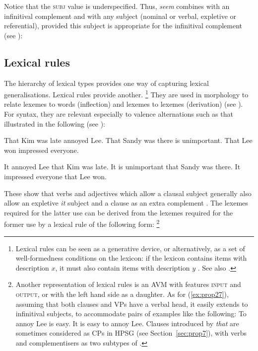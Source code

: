 \documentclass[output=paper,biblatex,babelshorthands,newtxmath,draftmode,colorlinks,citecolor=brown]{langscibook}
\begin{document}
\noindent
Notice that the \textsc{subj} value is underspecified. Thus, \emph{seem} combines with an
infinitival complement and with any subject (nominal or verbal, expletive or referential), provided
this subject is appropriate for the infinitival complement (see
): 

\eal\label{ex:prop25}
\zl


\subsection{Lexical rules}\label{sec:prop4.2}
\label{prop:sec-lex-rules}

The hierarchy of lexical types provides one way of capturing lexical generalisations. Lexical rules provide another.%
%
\footnote{Lexical rules can be seen as a generative device, or alternatively, as a set of
  well-formedness conditions on the lexicon: if the lexicon contains items with description $x$, it
  must also contain items with description $y$ \citep{Meurers2001a}. See also .}
%
They are used in morphology to relate lexemes to words (inflection) and lexemes to lexemes
(derivation) (see ). For syntax, they are relevant especially to valence alternations such as that illustrated in the following (see ):

\eal\label{ex:prop26}
\ex That Kim was late annoyed Lee.
\ex That Sandy was there is unimportant. 
\ex That Lee won impressed everyone.
\zl
	
\eal\label{ex:prop27}
\ex It annoyed Lee that Kim was late.
\ex It is unimportant that Sandy was there. 
\ex It impressed everyone that Lee won.
\zl

\noindent
These show that verbs and adjectives which allow a clausal subject generally also allow an expletive \emph{it} subject and a clause as an extra complement \citep[150]{ps2}. The lexemes required for the latter use can be derived from the lexemes required for the former use by a lexical rule of the following form:%
%
\footnote{Another representation of lexical rules is an AVM with features \textsc{input} and \textsc{output}, or with the left hand side as a daughter. As for (\ref{ex:prop27}), assuming that both clauses and VPs have a verbal head, it easily extends to infinitival subjects, to accommodate pairs of examples like the following:
	\eal
        \ex To annoy Lee is easy.
	\ex It is easy to annoy Lee.
	\zl
Clauses introduced by \emph{that} are sometimes considered as CPs in HPSG (see Section~\ref{sec:prop7}), with verbs and complementisers as two subtypes of .
}
%
\end{document}
